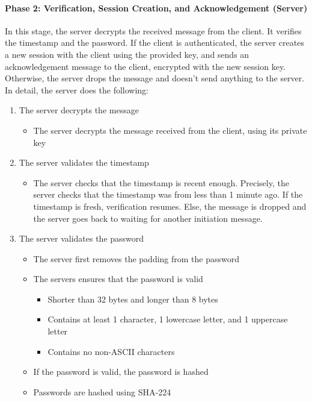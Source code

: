 \documentclass[12pt]{article}
\begin{document}
\paragraph{Phase 2: Verification, Session Creation, and Acknowledgement (Server)}

In this stage, the server decrypts the received message from the client. It verifies the timestamp and the password. If the client is authenticated, the server creates a new session with the client using the provided key, and sends an acknowledgement message to the client, encrypted with the new session key. Otherwise, the server drops the message and doesn’t send anything to the server. In detail, the server does the following:

\begin{enumerate}
    \item The server decrypts the message
    \begin{itemize}
        \item The server decrypts the message received from the client, using its private key
    \end{itemize}
    \item The server validates the timestamp
    \begin{itemize}
        \item The server checks that the timestamp is recent enough. Precisely, the server checks that the timestamp was from less than 1 minute ago. If the timestamp is fresh, verification resumes. Else, the message is dropped and the server goes back to waiting for another initiation message.
    \end{itemize}
    \item The server validates the password
    \begin{itemize}
        \item The server first removes the padding from the password
        \item The servers ensures that the password is valid
        \begin{itemize}
            \item  Shorter than 32 bytes and longer than 8 bytes
            \item Contains at least 1 character, 1 lowercase letter, and 1 uppercase letter
            \item Contains no non-ASCII characters
        \end{itemize}
        \item If the password is valid, the password is hashed
        \item Passwords are hashed using SHA-224

\end{itemize}
\end{enumerate}
\end{document}
